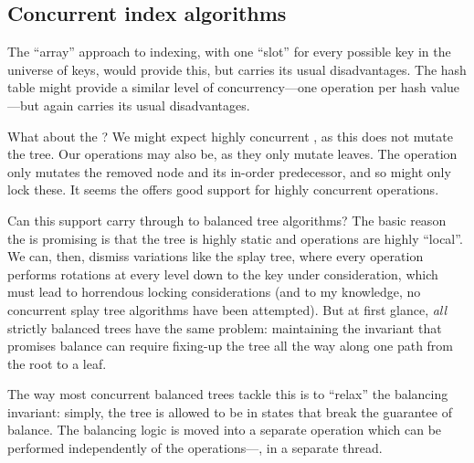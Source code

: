 \subsection{Concurrent index algorithms}

The \enquote{array} approach to indexing,
  with one \enquote{slot} for every possible key in the universe of keys,
  would provide this,
  but carries its usual disadvantages.
The hash table might provide a similar level of concurrency---one
   operation per hash value---but again carries its usual disadvantages.

What about the \BST?
We might expect highly concurrent
  ,
  as this does not mutate the tree.
Our  operations may also be,
  as they only mutate leaves.
The  operation only mutates
  the removed node and its in-order predecessor,
  and so might only lock these.
It seems the \BST offers good support for highly concurrent operations.

Can this support carry through to balanced tree algorithms?
The basic reason the \BST is promising is that
  the tree is highly static and operations are highly \enquote{local}.
We can, then, dismiss variations like the splay tree,
  where every operation performs rotations
    at every level down to the key under consideration,
  which must lead to horrendous locking considerations
  (and to my knowledge, no concurrent splay tree algorithms have been attempted).
But at first glance,
  \emph{all} strictly balanced trees have the same problem:
  maintaining the invariant that promises balance
  can require fixing-up the tree all the way along one path from the root to a leaf.

The way most concurrent balanced trees tackle this
  is to \enquote{relax} the balancing invariant:
  simply, the tree is allowed to be in states that break the guarantee of balance.
The balancing logic is moved into a separate operation
  which can be performed independently of the \API operations---\eg, in a separate thread.







